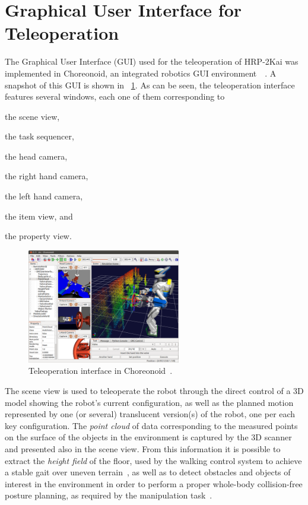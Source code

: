 \section{Graphical User Interface for Teleoperation}
	\label{sec:teleoperation_gui}
	
	The Graphical User Interface (GUI) used for the teleoperation of HRP-2Kai was implemented
	in Choreonoid, an integrated robotics GUI environment~\cite{Choreonoid}~\cite{Nakaoka_Choreonoid}.
	A snapshot of this GUI is shown in \figurename~\ref{fig:Choreonoid3}.
	As can be seen, the teleoperation interface features several windows, each one of them
	corresponding to
	\begin{inparaenum}[(1)]
		\item the scene view,
		\item the task sequencer,
		\item the head camera,
		\item the right hand camera,
		\item the left hand camera,
		\item the item view, and
		\item the property view.
	\end{inparaenum}
		
	\begin{figure}[t]
		\centering
		\includegraphics[height = 5cm]{img/Choreonoid3}
		\caption{Teleoperation interface in Choreonoid~\cite{Nakaoka_Humanoids}.}
		\label{fig:Choreonoid3}
	\end{figure}
	
	The scene view is used to teleoperate the robot through the direct control of a 3D model
	showing the robot's current configuration, as well as the planned motion represented by
	one (or several) translucent version(s) of the robot, one per each key configuration.
	The \emph{point cloud} of data corresponding to the measured points on the surface of the
	objects in the environment is captured by the 3D scanner and presented also in the scene view.
	From this information it is possible to extract the \emph{height field} of the floor,
	used by the walking control system to achieve a stable gait over uneven terrain~\cite{Morisawa},
	as well as to detect obstacles and objects of interest in the environment in order to perform
	a proper whole-body collision-free posture planning, as required by the manipulation
	task~\cite{Kanoun}.
	
